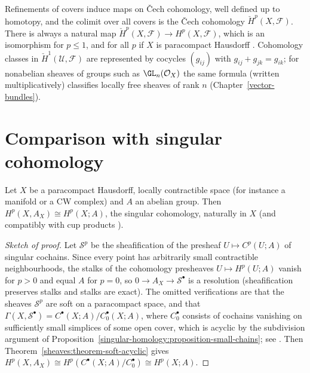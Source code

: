 \begin{remark}\label{sheaves:remark-cech-limit}
Refinements of covers induce maps on \v{C}ech cohomology, well defined up to homotopy, and the colimit over all covers is the \v{C}ech cohomology $\check{H}^p(X, \mathcal{F})$. There
is always a natural map $\check{H}^p(X, \mathcal{F}) \to H^p(X, \mathcal{F})$, which is an isomorphism for $p \leq 1$, and for all $p$ if $X$ is paracompact Hausdorff
\cite[Chapter II, Section 5]{godement-faisceaux}. Cohomology classes in $\check{H}^1(\mathcal{U}, \mathcal{F})$ are represented by cocycles $(g_{ij})$ with $g_{ij} + g_{jk} = g_{ik}$; for
nonabelian sheaves of groups such as $\GL_n(\mathcal{O}_X)$ the same formula (written multiplicatively) classifies locally free sheaves of rank $n$ (Chapter~\ref{vector-bundles}).
\end{remark}

\section{Comparison with singular cohomology}\label{sheaves:section-singular}

\begin{theorem}\label{sheaves:theorem-singular-comparison}
Let $X$ be a paracompact Hausdorff, locally contractible space (for instance a manifold or a CW complex) and $A$ an abelian group. Then $H^p(X, A_X) \cong H^p(X; A)$, the singular
cohomology, naturally in $X$ (and compatibly with cup products \cite[Chapter III]{bredon-sheaf}).
\end{theorem}

\begin{proof}[Sketch of proof]
Let $\mathcal{S}^p$ be the sheafification of the presheaf $U \mapsto C^p(U; A)$ of singular cochains. Since every point has arbitrarily small contractible neighbourhoods, the stalks of
the cohomology presheaves $U \mapsto H^p(U; A)$ vanish for $p > 0$ and equal $A$ for $p = 0$, so $0 \to A_X \to \mathcal{S}^\bullet$ is a resolution (sheafification preserves stalks and
stalks are exact). The omitted verifications are that the sheaves $\mathcal{S}^p$ are soft on a paracompact space, and that
$\Gamma(X, \mathcal{S}^\bullet) = C^\bullet(X; A)/C^\bullet_0(X; A)$, where $C^\bullet_0$ consists of cochains vanishing on sufficiently small simplices of some open cover, which is acyclic by
the subdivision argument of Proposition~\ref{singular-homology:proposition-small-chains}; see \cite[Chapter III]{bredon-sheaf}. Then
Theorem~\ref{sheaves:theorem-soft-acyclic} gives $H^p(X, A_X) \cong H^p(C^\bullet(X; A)/C_0^\bullet) \cong H^p(X; A)$.
\end{proof}

